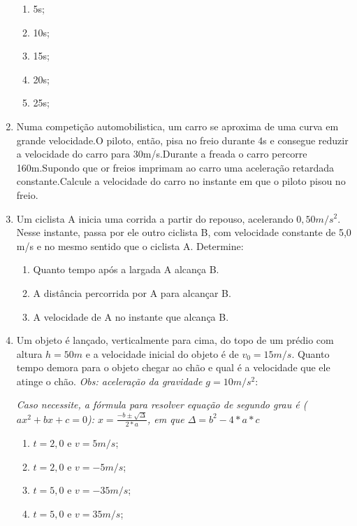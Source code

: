 \documentclass[12pt]{extarticle}
\newcommand{\<}{\langle}
\renewcommand{\>}{\rangle}
\theoremstyle{definition}
\begin{document}
\begin{enumerate}
            \begin{enumerate}
                \item 5s;
                \item 10s;
                \item 15s;
                \item 20s;
                \item 25s;
            \end{enumerate}
            
            \item Numa competição automobilistica, um carro se aproxima de uma curva em grande velocidade.O piloto, então, pisa no freio durante 4s e consegue reduzir a velocidade do carro para 30m/s.Durante a freada o carro percorre 160m.Supondo que or freios imprimam ao carro uma aceleração retardada constante.Calcule a velocidade do carro no instante em que o piloto pisou no freio.
            
            \item Um ciclista A inicia uma corrida a partir do repouso, acelerando $0,50 m/s^2$. Nesse instante, passa por ele outro ciclista B, com velocidade constante de 5,0 m/s e no mesmo sentido que o ciclista A. Determine:
            
            \begin{enumerate}
                \item Quanto tempo após a largada A alcança B.
                \item A distância percorrida por A para alcançar B.
                \item A velocidade de A no instante que alcança B.
            \end{enumerate}
        
        \item Um objeto é lançado, verticalmente para cima, do topo de um prédio com altura $h=50 m$ e a velocidade inicial do objeto é de $v_0 = 15 m/s$. Quanto tempo demora para o objeto chegar ao chão e qual é a velocidade que ele atinge o chão. \textit{Obs: aceleração da gravidade $g=10 m/s^2$}:
        
        \textit{Caso necessite, a fórmula para resolver equação de segundo grau é ($ax^2 +bx+c=0$): $x = \frac{-b \pm \sqrt{\Delta}}{2*a}$, em que $\Delta = b^2 - 4*a*c$}
        \begin{enumerate}
            \item $t=2,0$ e $v=5m/s$;
            \item $t=2,0$ e $v=-5m/s$;
            \item $t=5,0$ e $v=-35m/s$;
            \item $t=5,0$ e $v=35m/s$;
        \end{enumerate}
        \end{enumerate}
        
\end{document}
